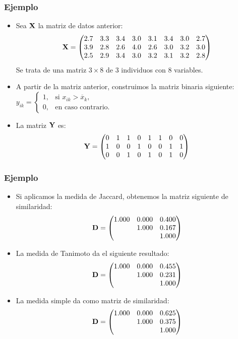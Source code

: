 \begin{frame}
\frametitle{Ejemplo}
\begin{itemize}
\item<2->{Sea $\mathbf{X}$ la matriz de datos anterior:
$$
\mathbf{X}=
\begin{pmatrix}
2.7&3.3&3.4&3.0&3.1&3.4&3.0&2.7\\
3.9&2.8&2.6&4.0&2.6&3.0&3.2&3.0\\
2.5&2.9&3.4&3.0&3.2&3.1&3.2&2.8
\end{pmatrix}
$$
Se trata de una matriz $3\times 8$ de $3$ individuos con $8$ variables.}
\item<3->{A partir de la matriz anterior, construimos la matriz binaria siguiente:
$y_{ik}=\left\{\begin{array}{ll}
1,&\mbox{si } x_{ik}> \overline{x}_k, \\
0,&\mbox{en caso contrario.}
\end{array}
\right.$}
\item<4->{La matriz $\mathbf{Y}$ es:
$$
\mathbf{Y}=
\begin{pmatrix}
 0  &  1  &  1 &   0  &  1  &  1  &  0  &   0  \\
  1  &   0  &   0  &   1  &   0  &   0 &    1 &    1 \\
  0  &   0  &   1  &   0  &   1  &   0 &    1  &   0\\
\end{pmatrix}
$$
}
\end{itemize}
\end{frame}
\begin{frame}
\frametitle{Ejemplo}
\begin{itemize}
\item<2->{Si aplicamos la medida de Jaccard, obtenemos la matriz siguiente de similaridad:
$$
\mathbf{D}=
\begin{pmatrix}
1.000 & 0.000 & 0.400 \\
&1.000 & 0.167 \\
&&1.000
\end{pmatrix}
$$
}
\item<3->{La medida de Tanimoto da el siguiente resultado:
$$
\mathbf{D}=
\begin{pmatrix}
1.000 & 0.000 & 0.455 \\
&1.000 & 0.231 \\
&&1.000
\end{pmatrix}
$$}
\item<4->{La medida simple da como matriz de similaridad:
$$
\mathbf{D}=
\begin{pmatrix}
1.000 & 0.000 & 0.625 \\
&1.000 & 0.375 \\
&&1.000
\end{pmatrix}
$$}
\end{itemize}
\end{frame}
